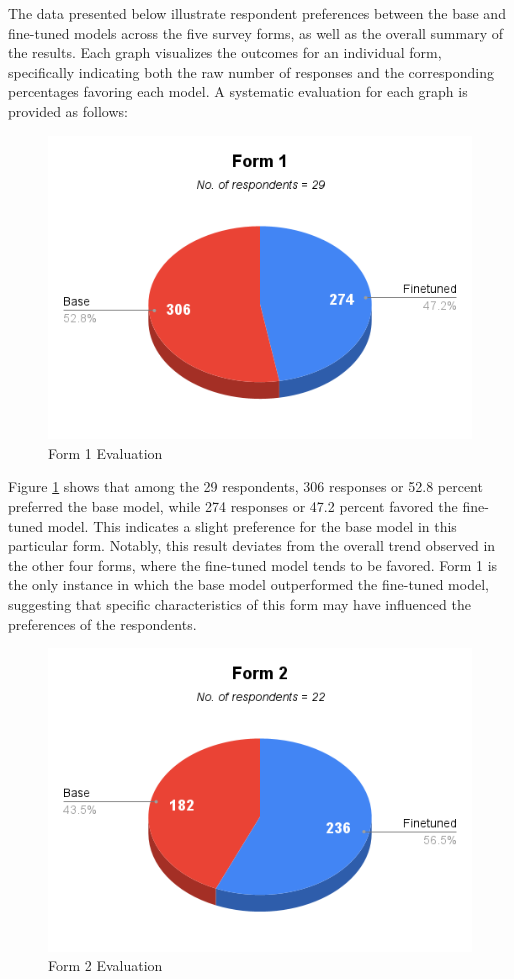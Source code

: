 The data presented below illustrate respondent preferences between the base and fine-tuned models across the five survey forms, as well as the overall summary of the results. Each graph visualizes the outcomes for an individual form, specifically indicating both the raw number of responses and the corresponding percentages favoring each model. A systematic evaluation for each graph is provided as follows:

\begin{figure}[htbp]
	\centering
	\includegraphics[scale=0.7]{figures/Form1.png}
	\caption{Form 1 Evaluation}
	\label{fig:form1}
\end{figure}

Figure \ref{fig:form1} shows that among the 29 respondents, 306 responses or 52.8 percent preferred the base model, while 274 responses or 47.2 percent favored the fine-tuned model. This indicates a slight preference for the base model in this particular form. Notably, this result deviates from the overall trend observed in the other four forms, where the fine-tuned model tends to be favored. Form 1 is the only instance in which the base model outperformed the fine-tuned model, suggesting that specific characteristics of this form may have influenced the preferences of the respondents. 


\begin{figure}[htbp]
	\centering
	\includegraphics[scale=0.7]{figures/Form2.png}
	\caption{Form 2 Evaluation}
	\label{fig:form2}
\end{figure}

